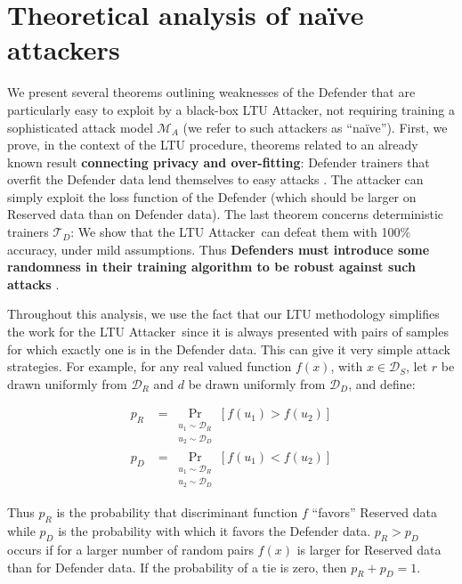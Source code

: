 \documentclass[letterpaper]{article}
\newcommand{\oracle}{LTU Attacker~}
\begin{document}

\section{Theoretical analysis of na\"ive attackers}
We present several theorems outlining weaknesses of the Defender that are particularly easy to exploit by a black-box LTU Attacker, not requiring training a sophisticated attack model $\mathcal{M}_A$ (we refer to such attackers as ``na\"ive''). %
First, we prove, in the context of the LTU procedure, theorems related to an already known result {\bf connecting privacy and over-fitting}: Defender trainers that overfit the Defender data lend themselves to easy attacks  \cite{yeom2018privacy}. The attacker can simply exploit the loss function of the Defender (which should be larger on Reserved data than on Defender data).
The last theorem concerns deterministic trainers  $\mathcal{T}_D$: We show that the \oracle can defeat them with 100\% accuracy, under mild assumptions. Thus {\bf Defenders must introduce some randomness in their training algorithm to be robust against such attacks} \cite{Dwork2017}. 

Throughout this analysis, we use the fact that our LTU methodology simplifies the work for the \oracle since it is always presented with pairs of samples for which exactly one is in the Defender data. This can give it very simple attack strategies.
For example, for any real valued function $f(x)$, with $x \in \mathcal{D}_S$, let $r$ be drawn uniformly from $\mathcal{D}_R$ and $d$ be drawn uniformly from $\mathcal{D}_D$, and define:

\begin{align}
p_R &= \mathop{Pr}_{\substack{u_1 \sim \mathcal{D}_R \\ u_2 \sim \mathcal{D}_D}}[f(u_1)>f(u_2)] \\
p_D &= \mathop{Pr}_{\substack{u_1 \sim \mathcal{D}_R \\ u_2 \sim \mathcal{D}_D}}[f(u_1)<f(u_2)]
\end{align}

Thus $p_R$ is the probability that discriminant function $f$ ``favors'' Reserved data while $p_D$ is the probability with which it favors the Defender data. $p_R  > p_D$ occurs if for a larger number of random pairs $f(x)$ is larger for Reserved data than for Defender data. If the probability of a tie is zero, then $p_R+p_D=1$.
\end{document}
